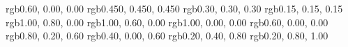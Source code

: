 %
%
%
\RequirePackage{xcolor}
%
       {rgb}{0.60, 0.00, 0.00} %
      {rgb}{0.450, 0.450, 0.450} %
      {rgb}{0.30, 0.30, 0.30} %
      {rgb}{0.15, 0.15, 0.15} %
% 
    {rgb}{1.00, 0.80, 0.00} %
    {rgb}{1.00, 0.60, 0.00} %
  {rgb}{1.00, 0.00, 0.00} %
     {rgb}{0.60, 0.00, 0.00} %
    {rgb}{0.80, 0.20, 0.60} %
    {rgb}{0.40, 0.00, 0.60} %
  {rgb}{0.20, 0.40, 0.80} %
 {rgb}{0.20, 0.80, 1.00} %
